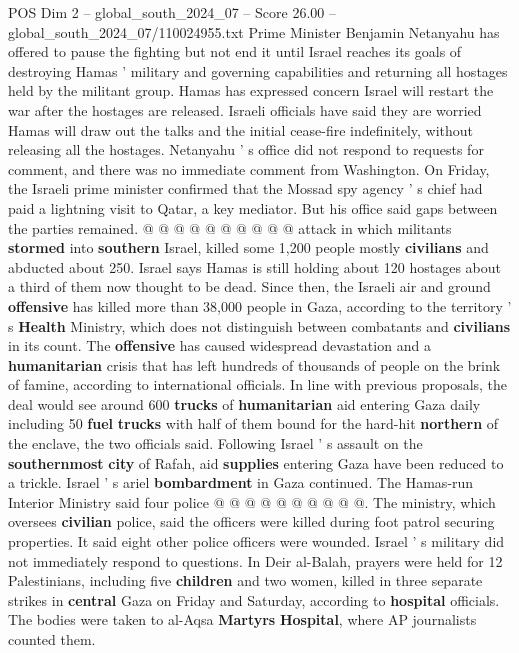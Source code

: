 \begin{textsample}{POS Dim 2 – global\_south\_2024\_07 – Score 26.00 – global\_south\_2024\_07/110024955.txt}
Prime Minister Benjamin Netanyahu has offered to pause the fighting but not end it until Israel reaches its goals of destroying Hamas ' military and governing capabilities and returning all hostages held by the militant group.
Hamas has expressed concern Israel will restart the war after the hostages are released.
Israeli officials have said they are worried Hamas will draw out the talks and the initial cease-fire indefinitely, without releasing all the hostages.
Netanyahu ' s office did not respond to requests for comment, and there was no immediate comment from Washington.
On Friday, the Israeli prime minister confirmed that the Mossad spy agency ' s chief had paid a lightning visit to Qatar, a key mediator.
But his office said gaps between the parties remained. @ @ @ @ @ @ @ @ @ @ attack in which militants \textbf{stormed} into \textbf{southern} Israel, killed some 1,200 people mostly \textbf{civilians} and abducted about 250.
Israel says Hamas is still holding about 120 hostages about a third of them now thought to be dead.
Since then, the Israeli air and ground \textbf{offensive} has killed more than 38,000 people in Gaza, according to the territory ' s \textbf{Health} Ministry, which does not distinguish between combatants and \textbf{civilians} in its count.
The \textbf{offensive} has caused widespread devastation and a \textbf{humanitarian} crisis that has left hundreds of thousands of people on the brink of famine, according to international officials.
In line with previous proposals, the deal would see around 600 \textbf{trucks} of \textbf{humanitarian} aid entering Gaza daily including 50 \textbf{fuel} \textbf{trucks} with half of them bound for the hard-hit \textbf{northern} of the enclave, the two officials said.
Following Israel ' s assault on the \textbf{southernmost} \textbf{city} of Rafah, aid \textbf{supplies} entering Gaza have been reduced to a trickle.
Israel ' s ariel \textbf{bombardment} in Gaza continued.
The Hamas-run Interior Ministry said four police @ @ @ @ @ @ @ @ @ @.
The ministry, which oversees \textbf{civilian} police, said the officers were killed during foot patrol securing properties.
It said eight other police officers were wounded.
Israel ' s military did not immediately respond to questions.
In Deir al-Balah, prayers were held for 12 Palestinians, including five \textbf{children} and two women, killed in three separate strikes in \textbf{central} Gaza on Friday and Saturday, according to \textbf{hospital} officials.
The bodies were taken to al-Aqsa \textbf{Martyrs} \textbf{Hospital}, where AP journalists counted them.

\end{textsample}
